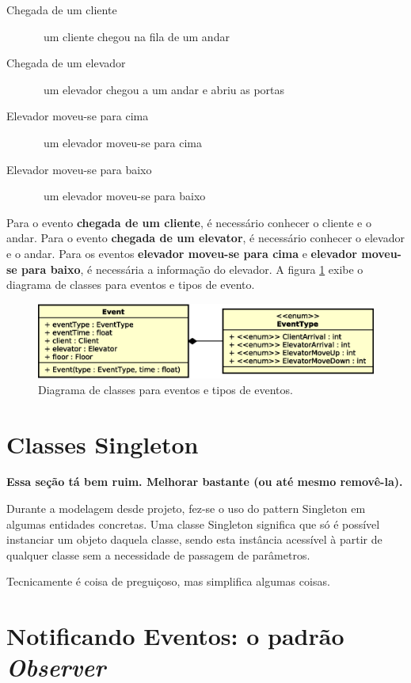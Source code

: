 \begin{description}
  \item[Chegada de um cliente] \hfill \ um cliente chegou na fila de um andar
  \item[Chegada de um elevador] \hfill \ um elevador chegou a um andar e abriu as portas
  \item[Elevador moveu-se para cima] \hfill \ um elevador moveu-se para cima
  \item[Elevador moveu-se para baixo] \hfill \ um elevador moveu-se para baixo
\end{description}

Para o evento \textbf{chegada de um cliente}, é necessário conhecer o cliente e
o andar. Para o evento \textbf{chegada de um elevator}, é necessário conhecer o
elevador e o andar. Para os eventos \textbf{elevador moveu-se para cima} e
\textbf{elevador moveu-se para baixo}, é necessária a informação do elevador. A
figura \ref{fig:diagram:event} exibe o diagrama de classes para eventos e tipos
de evento.

\begin{figure}[htb!]
  \centering
  \includegraphics[scale=0.6]{img/event.eps}
  \caption{Diagrama de classes para eventos e tipos de eventos.}
\label{fig:diagram:event}
\end{figure}

\section{Classes Singleton}

\textbf{Essa seção tá bem ruim. Melhorar bastante (ou até mesmo removê-la).}

Durante a modelagem desde projeto, fez-se o uso do pattern Singleton em algumas
entidades concretas. Uma classe Singleton significa que só é possível instanciar
um objeto daquela classe, sendo esta instância acessível à partir de qualquer
classe sem a necessidade de passagem de parâmetros.

Tecnicamente é coisa de preguiçoso, mas simplifica algumas coisas.

\section{\label{sec:model:notify}Notificando Eventos: o padrão
\textit{Observer}}

